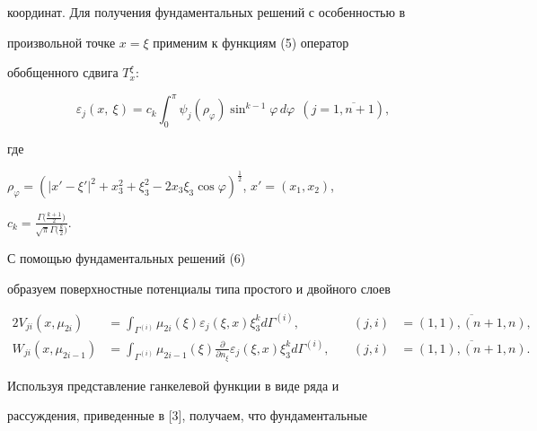 координат. Для получения фундаментальных решений с особенностью в


произвольной точке $x=\xi$ применим к функциям (5) оператор


обобщенного сдвига $T_{x}^{\xi}$:


\begin{equation}


\varepsilon_j(x,\ \xi)=


c_k\int_{0}^{\pi}\psi_j(\rho_{\varphi})\sin^{k-1}\varphi


\,d\varphi \ \ (j=\overline{1,n+1}),


\end{equation}


где


$\rho_{\varphi}=(|x'-\xi'|^2+x_3^2+\xi_3^2-2x_3\xi_3\cos\varphi


)^{\frac{1}{2}}$, $x'=(x_1,x_2)$,


$c_k=\frac{\Gamma\big(\frac{k+1}{2}\big)}


{\sqrt{\pi}\Gamma\big(\frac{k}{2}\big)}$.





С помощью фундаментальных решений (6)


образуем поверхностные потенциалы типа простого и двойного слоев


\begin{alignat*}{2}


V_{ji}(x,\mu_{2i})&=\int_{\Gamma^{(i)}}


\mu_{2i}(\xi)\varepsilon_j(\xi,x)\xi_3^k d\Gamma^{(i)},


&\quad (j,i)&=\overline{(1,1),(n+1,n)},\\


%


W_{ji}(x,\mu_{2i-1})&=\int_{\Gamma^{(i)}}


\mu_{2i-1}(\xi)\frac{\partial }{\partial


n_{\xi}}\varepsilon_j(\xi,x)\xi_3^k d\Gamma^{(i)},


&\quad (j,i)&=\overline{(1,1),(n+1,n)}.


\end{alignat*}








Используя представление ганкелевой функции в виде ряда и


рассуждения, приведенные в [3], получаем, что фундаментальные


